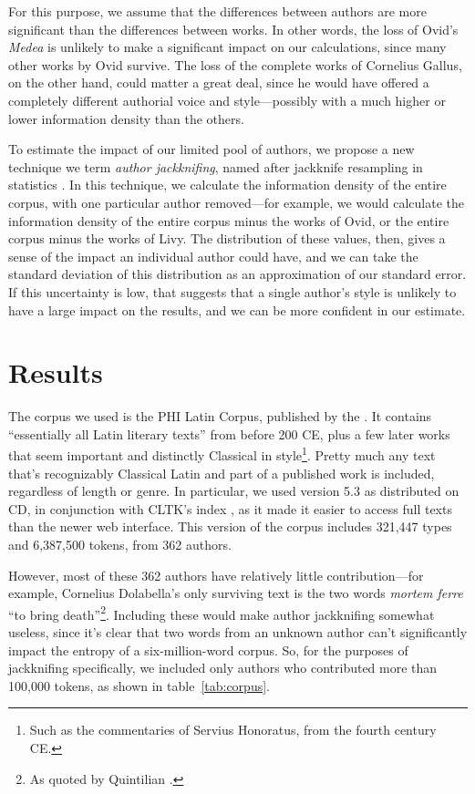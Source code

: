 \documentclass[12pt,twoside]{article}
\begin{document}
For this purpose, we assume that the differences between authors are more significant than the differences between works. In other words, the loss of Ovid's \emph{Medea} is unlikely to make a significant impact on our calculations, since many other works by Ovid survive. The loss of the complete works of Cornelius Gallus, on the other hand, could matter a great deal, since he would have offered a completely different authorial voice and style---possibly with a much higher or lower information density than the others.

To estimate the impact of our limited pool of authors, we propose a new technique we term \emph{author jackknifing}, named after jackknife resampling in statistics \citep{efron}. In this technique, we calculate the information density of the entire corpus, with one particular author removed---for example, we would calculate the information density of the entire corpus minus the works of Ovid, or the entire corpus minus the works of Livy. The distribution of these values, then, gives a sense of the impact an individual author could have, and we can take the standard deviation of this distribution as an approximation of our standard error. If this uncertainty is low, that suggests that a single author's style is unlikely to have a large impact on the results, and we can be more confident in our estimate.

\section{Results}
\label{sec:res}

The corpus we used is the PHI Latin Corpus, published by the \citet{phi}. It contains ``essentially all Latin literary texts'' from before 200 CE, plus a few later works that seem important and distinctly Classical in style\footnote{Such as the commentaries of Servius Honoratus, from the fourth century CE.}. Pretty much any text that's recognizably Classical Latin and part of a published work is included, regardless of length or genre. In particular, we used version 5.3 as distributed on CD, in conjunction with CLTK's index \citep{cltk}, as it made it easier to access full texts than the newer web interface. This version of the corpus includes 321,447 types and 6,387,500 tokens, from 362 authors.

However, most of these 362 authors have relatively little contribution---for example, Cornelius Dolabella's only surviving text is the two words \emph{mortem ferre} ``to bring death''\footnote{As quoted by Quintilian \citep[VIII.2.4]{quintilian}.}. Including these would make author jackknifing somewhat useless, since it's clear that two words from an unknown author can't significantly impact the entropy of a six-million-word corpus. So, for the purposes of jackknifing specifically, we included only authors who contributed more than 100,000 tokens, as shown in table~\ref{tab:corpus}.
\end{document}
